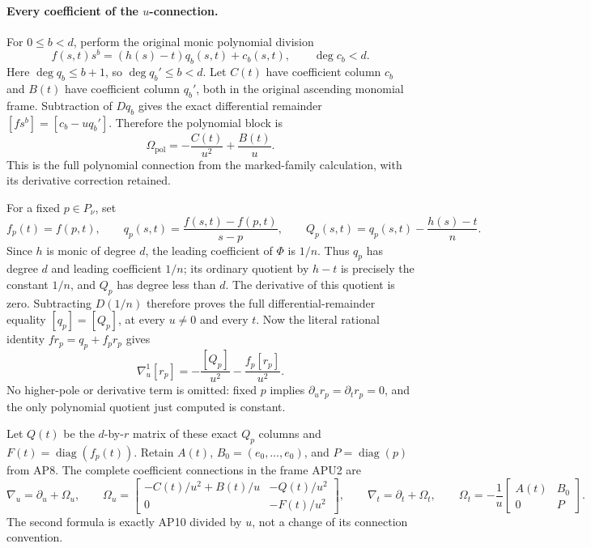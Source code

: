 \paragraph{Every coefficient of the \(u\)-connection.}
For \(0\leq b<d\), perform the original monic polynomial division
\[
 f(s,t)s^b=(h(s)-t)q_b(s,t)+c_b(s,t),\qquad \deg c_b<d.
\]
Here \(\deg q_b\leq b+1\), so \(\deg q_b'\leq b<d\).
Let \(C(t)\) have coefficient column \(c_b\) and \(B(t)\) have
coefficient column \(q_b'\), both in the original ascending monomial
frame.  Subtraction of \(Dq_b\) gives the exact differential remainder
\([fs^b]=[c_b-uq_b']\).  Therefore the polynomial block is
\[
 \Omega_{\mathrm{pol}}
       =-\frac{C(t)}{u^2}+\frac{B(t)}u .
 \tag{APU6}
\]
This is the full polynomial connection from the marked-family
calculation, with its derivative correction retained.

For a fixed \(p\in P_\nu\), set
\[
 f_p(t)=f(p,t),\qquad
 q_p(s,t)=\frac{f(s,t)-f(p,t)}{s-p},\qquad
 Q_p(s,t)=q_p(s,t)-\frac{h(s)-t}{n}.
 \tag{APU7}
\]
Since \(h\) is monic of degree \(d\), the leading coefficient of
\(\Phi\) is \(1/n\).  Thus \(q_p\) has degree \(d\) and leading
coefficient \(1/n\); its ordinary quotient by \(h-t\) is precisely
the constant \(1/n\), and \(Q_p\) has degree less than \(d\).
The derivative of this quotient is zero.  Subtracting \(D(1/n)\)
therefore proves the full differential-remainder equality
\([q_p]=[Q_p]\), at every \(u\ne0\) and every \(t\).
Now the literal rational identity
\(fr_p=q_p+f_pr_p\) gives
\[
 \nabla_u^1[r_p]
     =-\frac{[Q_p]}{u^2}-\frac{f_p[r_p]}{u^2}.
 \tag{APU8}
\]
No higher-pole or derivative term is omitted: fixed \(p\) implies
\(\partial_u r_p=\partial_t r_p=0\), and the only polynomial
quotient just computed is constant.

Let \(Q(t)\) be the \(d\)-by-\(r\) matrix of these exact \(Q_p\)
columns and \(F(t)=\operatorname{diag}(f_p(t))\).
Retain \(A(t)\), \(B_0=(e_0,\ldots,e_0)\), and
\(P=\operatorname{diag}(p)\) from AP8.  The complete coefficient
connections in the frame APU2 are
\[
 \boxed{\displaystyle
 \nabla_u=\partial_u+\Omega_u,\qquad
 \Omega_u=
 \begin{bmatrix}
 -C(t)/u^2+B(t)/u&-Q(t)/u^2\\
 0&-F(t)/u^2
 \end{bmatrix},\qquad
 \nabla_t=\partial_t+\Omega_t,\qquad
 \Omega_t=-\frac1u
 \begin{bmatrix}A(t)&B_0\\0&P\end{bmatrix}.}
 \tag{APU9}
\]
The second formula is exactly AP10 divided by \(u\), not a change
of its connection convention.

